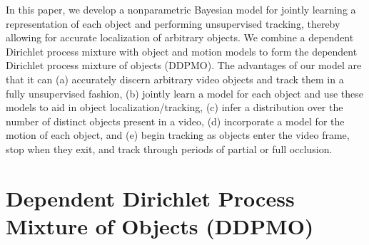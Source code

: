 \documentclass{article}
\begin{document}
In this paper, we develop a nonparametric Bayesian model for jointly learning a representation of each object and performing unsupervised tracking, thereby allowing for accurate localization of arbitrary objects. We combine a dependent Dirichlet process mixture with object and motion models to form the dependent Dirichlet process mixture of objects (DDPMO). The advantages of our model are that it can (a) accurately discern arbitrary video objects and track them in a fully unsupervised fashion, (b) jointly learn a model for each object and use these models to aid in object localization/tracking, (c) infer a distribution over the number of distinct objects present in a video, (d) incorporate a model for the motion of each object, and (e) begin tracking as objects enter the video frame, stop when they exit, and track through periods of partial or full occlusion.


\section{Dependent Dirichlet Process Mixture of Objects (DDPMO)}
\end{document}
